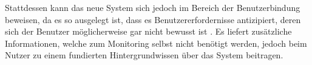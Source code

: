 Stattdessen kann das neue System sich jedoch im Bereich der Benutzerbindung beweisen, da es so ausgelegt ist, \glqq dass es Benutzererfordernisse antizipiert, deren sich der Benutzer möglicherweise gar nicht bewusst ist\grqq{} \cite[S. 31]{DIN_EN_ISO_9241-110}. Es liefert zusätzliche Informationen, welche zum Monitoring selbst nicht benötigt werden, jedoch beim Nutzer zu einem fundierten Hintergrundwissen über das System beitragen.


